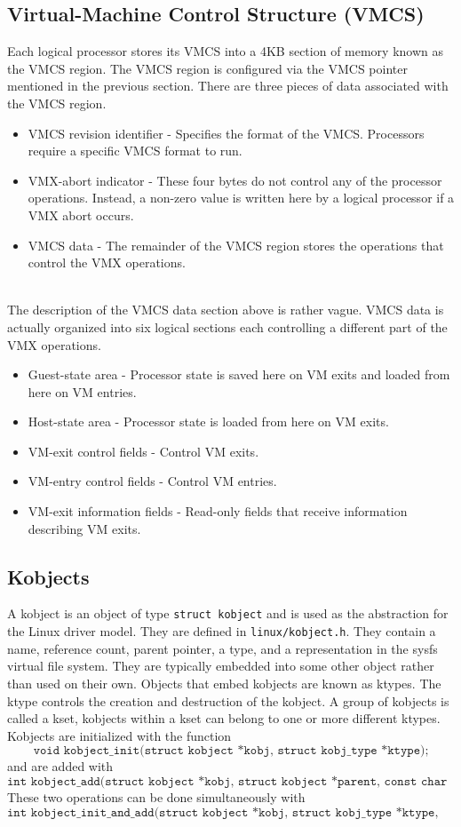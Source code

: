 \documentclass[onecolumn, draftclsnofoot,10pt, compsoc]{IEEEtran}
\begin{document}
  \subsection{Virtual-Machine Control Structure (VMCS)}
  Each logical processor stores its VMCS into a 4KB section of memory known as the VMCS region.
  The VMCS region is configured via the VMCS pointer mentioned in the previous section.
  There are three pieces of data associated with the VMCS region.
  \begin{itemize}
      \item VMCS revision identifier - Specifies the format of the VMCS. Processors require a specific VMCS format to run.
      \item VMX-abort indicator - These four bytes do not control any of the processor operations. Instead, a non-zero value is written here by a logical processor if a VMX abort occurs.
      \item VMCS data - The remainder of the VMCS region stores the operations that control the VMX operations.
  \end{itemize}
  \ \\
  The description of the VMCS data section above is rather vague. VMCS data is actually organized into six logical sections each controlling a different part of the VMX operations.
  
  \begin{itemize}
      \item Guest-state area - Processor state is saved here on VM exits and loaded from here on VM entries.
      \item Host-state area - Processor state is loaded from here on VM exits.
      \item VM-exit control fields - Control VM exits.
      \item VM-entry control fields - Control VM entries.
      \item VM-exit information fields - Read-only fields that receive information describing VM exits.
  \end{itemize}

  \subsection{Kobjects}
  A kobject is an object of type \texttt{struct kobject} and is used as the abstraction for the Linux driver model. They are defined in \texttt{linux/kobject.h}.
  They contain a name, reference count, parent pointer, a type, and a representation in the sysfs virtual file system. They are typically embedded into some other object rather than used on their own.
  Objects that embed kobjects are known as ktypes. The ktype controls the creation and destruction of the kobject. A group of kobjects is called a kset, kobjects within a kset can belong to one or more different ktypes.
  Kobjects are initialized with the function \[ \texttt{void kobject\_init(struct kobject *kobj, struct kobj\_type *ktype);}\] and are added with \[ \texttt{int kobject\_add(struct kobject *kobj, struct kobject *parent, const char *fmt, ...);}\]
  These two operations can be done simultaneously with \[ \texttt{int kobject\_init\_and\_add(struct kobject *kobj, struct kobj\_type *ktype, ...);}\]
\end{document}
